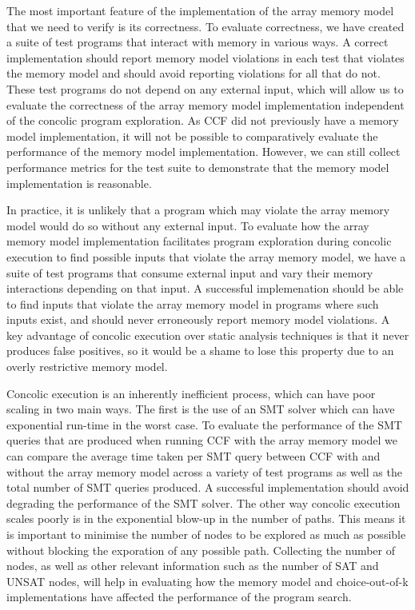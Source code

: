 \documentclass[12pt,twoside]{report}
\begin{document}
The most important feature of the implementation of the array memory model that we need to verify is its correctness. To evaluate correctness, we have created a suite of test programs that interact with memory in various ways. A correct implementation should report memory model violations in each test that violates the memory model and should avoid reporting violations for all that do not. These test programs do not depend on any external input, which will allow us to evaluate the correctness of the array memory model implementation independent of the concolic program exploration. As CCF did not previously have a memory model implementation, it will not be possible to comparatively evaluate the performance of the memory model implementation. However, we can still collect performance metrics for the test suite to demonstrate that the memory model implementation is reasonable.

In practice, it is unlikely that a program which may violate the array memory model would do so without any external input. To evaluate how the array memory model implementation facilitates program exploration during concolic execution to find possible inputs that violate the array memory model, we have a suite of test programs that consume external input and vary their memory interactions depending on that input. A successful implemenation should be able to find inputs that violate the array memory model in programs where such inputs exist, and should never erroneously report memory model violations. A key advantage of concolic execution over static analysis techniques is that it never produces false positives, so it would be a shame to lose this property due to an overly restrictive memory model.

Concolic execution is an inherently inefficient process, which can have poor scaling in two main ways. The first is the use of an SMT solver which can have exponential run-time in the worst case. To evaluate the performance of the SMT queries that are produced when running CCF with the array memory model we can compare the average time taken per SMT query between CCF with and without the array memory model across a variety of test programs as well as the total number of SMT queries produced. A successful implementation should avoid degrading the performance of the SMT solver. The other way concolic execution scales poorly is in the exponential blow-up in the number of paths. This means it is important to minimise the number of nodes to be explored as much as possible without blocking the exporation of any possible path. Collecting the number of nodes, as well as other relevant information such as the number of SAT and UNSAT nodes, will help in evaluating how the memory model and choice-out-of-k implementations have affected the performance of the program search.
\end{document}
